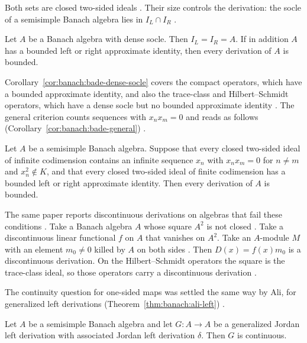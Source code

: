 Both sets are closed two-sided ideals
\cite[Theorem~2.3, p.~375]{BadeCurtis1974}. Their size controls the derivation:
the socle of a semisimple Banach algebra lies in $I_L\cap I_R$
\cite[Theorem~2.7, pp.~378--379]{BadeCurtis1974}.

\begin{corollary}\label{cor:banach:bade-dense-socle}
Let $A$ be a Banach algebra with dense socle. Then $I_L=I_R=A$. If in addition
$A$ has a bounded left or right approximate identity, then every derivation of
$A$ is bounded.
\end{corollary}

Corollary~\ref{cor:banach:bade-dense-socle} covers the compact operators,
which have a bounded approximate identity, and also the trace-class and
Hilbert--Schmidt operators, which have a dense socle but no bounded approximate
identity \cite[p.~379]{BadeCurtis1974}. The general criterion counts
sequences with $x_nx_m=0$ and reads as follows (Corollary~\ref{cor:banach:bade-general})
\cite[Corollary~2.6, p.~378]{BadeCurtis1974}.\begin{corollary}\label{cor:banach:bade-general}
Let $A$ be a semisimple Banach algebra. Suppose that every closed two-sided
ideal of infinite codimension contains an infinite sequence $x_n$ with
$x_nx_m=0$ for $n\neq m$ and $x_n^2\notin K$, and that every closed two-sided
ideal of finite codimension has a bounded left or right approximate identity.
Then every derivation of $A$ is bounded.
\end{corollary}

The same paper reports discontinuous derivations on algebras that fail these
conditions \cite[p.~375]{BadeCurtis1974}. Take a Banach algebra $A$ whose
square $A^2$ is not closed
\cite[p.~375]{BadeCurtis1974}. Take a discontinuous linear functional $f$ on
$A$ that vanishes on $A^2$. Take an $A$-module $M$ with an element
$m_0\neq0$ killed by $A$ on both sides
\cite[p.~375]{BadeCurtis1974}. Then $D(x)=f(x)m_0$ is a discontinuous
derivation. On the Hilbert--Schmidt operators the square is the trace-class
ideal, so those operators carry a discontinuous derivation
\cite[p.~375]{BadeCurtis1974}.

The continuity question for one-sided maps was settled the same way by Ali,
for generalized left derivations (Theorem~\ref{thm:banach:ali-left}) \cite[p.~209]{Ali2011GeneralizedLeft}.

\begin{theorem}\label{thm:banach:ali-left}
Let $A$ be a semisimple Banach algebra and let $G\colon A\to A$ be a
generalized Jordan left derivation with associated Jordan left derivation
$\delta$. Then $G$ is continuous.
\end{theorem}


